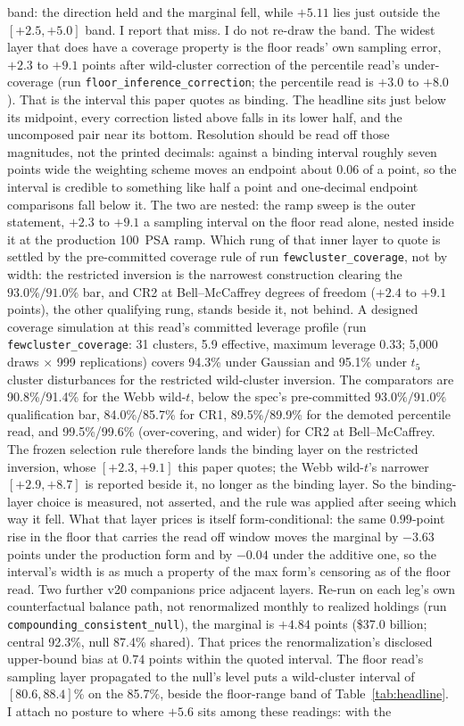 \documentclass[12pt]{article}
\begin{document}
band: the direction held and the marginal fell, while $+5.11$ lies just outside the $[+2.5, +5.0]$ band. I report that miss. I do not re-draw the band. The widest layer that does have a coverage property is the floor reads' own sampling error, $+2.3$ to $+9.1$ points after wild-cluster correction of the percentile read's under-coverage (run \texttt{floor\_inference\_correction}; the percentile read is $+3.0$ to $+8.0$). That is the interval this paper quotes as binding. The headline sits just below its midpoint, every correction listed above falls in its lower half, and the uncomposed pair near its bottom. Resolution should be read off those magnitudes, not the printed decimals: against a binding interval roughly seven points wide the weighting scheme moves an endpoint about $0.06$ of a point, so the interval is credible to something like half a point and one-decimal endpoint comparisons fall below it. The two are nested: the ramp sweep is the outer statement, $+2.3$ to $+9.1$ a sampling interval on the floor read alone, nested inside it at the production 100~PSA ramp. Which rung of that inner layer to quote is settled by the pre-committed coverage rule of run \texttt{fewcluster\_coverage}, not by width: the restricted inversion is the narrowest construction clearing the $93.0\%/91.0\%$ bar, and CR2 at Bell--McCaffrey degrees of freedom ($+2.4$ to $+9.1$ points), the other qualifying rung, stands beside it, not behind. A designed coverage simulation at this read's committed leverage profile (run \texttt{fewcluster\_coverage}: 31 clusters, 5.9 effective, maximum leverage 0.33; 5{,}000 draws $\times$ 999 replications) covers 94.3\% under Gaussian and 95.1\% under $t_5$ cluster disturbances for the restricted wild-cluster inversion. The comparators are 90.8\%/91.4\% for the Webb wild-$t$, below the spec's pre-committed $93.0\%/91.0\%$ qualification bar, 84.0\%/85.7\% for CR1, 89.5\%/89.9\% for the demoted percentile read, and 99.5\%/99.6\% (over-covering, and wider) for CR2 at Bell--McCaffrey. The frozen selection rule therefore lands the binding layer on the restricted inversion, whose $[+2.3, +9.1]$ this paper quotes; the Webb wild-$t$'s narrower $[+2.9, +8.7]$ is reported beside it, no longer as the binding layer. So the binding-layer choice is measured, not asserted, and the rule was applied after seeing which way it fell. What that layer prices is itself form-conditional: the same $0.99$-point rise in the floor that carries the read off window moves the marginal by $-3.63$ points under the production form and by $-0.04$ under the additive one, so the interval's width is as much a property of the max form's censoring as of the floor read. Two further v20 companions price adjacent layers. Re-run on each leg's own counterfactual balance path, not renormalized monthly to realized holdings (run \texttt{compounding\_consistent\_null}), the marginal is $+4.84$ points (\$37.0 billion; central 92.3\%, null 87.4\% shared). That prices the renormalization's disclosed upper-bound bias at $0.74$ points within the quoted interval. The floor read's sampling layer propagated to the null's level puts a wild-cluster interval of $[80.6, 88.4]$\% on the 85.7\%, beside the floor-range band of Table~\ref{tab:headline}. I attach no posture to where $+5.6$ sits among these readings: with the 
\end{document}
